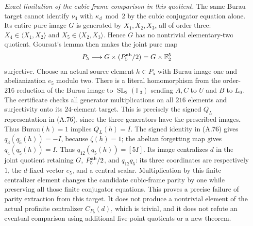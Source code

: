 \emph{Exact limitation of the cubic-frame comparison in this quotient.}
The same Burau target cannot identify $\nu_4$ with
$\kappa_d\bmod2$ by the cubic conjugator equation alone.
Its entire pure image $G$ is generated by $X_1,X_2,X_3$, all
of order three: $X_4\in\langle X_1,X_2\rangle$ and
$X_5\in\langle X_2,X_3\rangle$. Hence $G$ has no
nontrivial elementary-two quotient. Goursat's lemma then makes
the joint pure map
\[
            P_5\longrightarrow G\times(P_5^{\rm ab}/2)
                              =G\times\mathbb F_2^5
\]
surjective. Choose an actual source element $h\in P_5$ with
Burau image one and abelianization $e_5$ modulo two.
There is a literal homomorphism from the order-$216$ reduction
of the Burau image to $\operatorname{SL}_2(\mathbb F_3)$
sending $A,C$ to $U$ and $B$ to $L_0$. The certificate checks
all generator multiplications on all $216$ elements and
surjectivity onto its $24$-element target. This is precisely
the signed $Q_L$ representation in (A.76), since the three
generators have the prescribed images. Thus Burau$(h)=1$
implies $Q_L(h)=I$. The signed identity in (A.76) gives
$q_3(q_5(h))=-I$, because $\zeta(h)=1$;
the abelian forgetting map gives $q_4(q_5(h))=I$.
Thus $q_{12}(q_5(h))=[5I]$.
Its image centralizes $d$ in the joint quotient retaining
$G$, $P_5^{\rm ab}/2$, and $q_{12}q_5$: its three coordinates
are respectively $1$, the $d$-fixed vector $e_5$, and a central
scalar. Multiplication by this finite centralizer element
changes the candidate cubic-frame parity by one while preserving
all those finite conjugator equations. This proves a precise
failure of parity extraction from this target. It does not
produce a nontrivial element of the actual profinite centralizer
$C_{P_5}(d)$, which is trivial, and it does not refute an eventual
comparison using additional five-point quotients or a new theorem.

